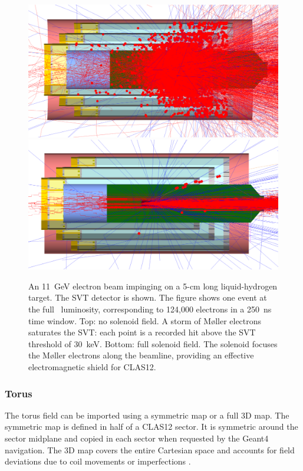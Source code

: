 \begin{figure}
	\centering
	\includegraphics[width=0.98\columnwidth,keepaspectratio]{img/solenoidOFF.png}
	\includegraphics[width=0.98\columnwidth,keepaspectratio]{img/solenoidON.png}
        \caption{An 11~GeV electron beam impinging on a 5-cm long liquid-hydrogen target. The SVT detector is shown. The
          figure shows one event at the full \cLuminosity\ luminosity, corresponding to 124,000 electrons in a 250~ns time
          window. Top: no solenoid field. A storm of M\o ller electrons saturates the SVT: each point is a recorded hit above
          the SVT threshold of 30~keV. Bottom: full solenoid field. The solenoid focuses the M\o ller electrons along the
          beamline, providing an effective electromagnetic shield for CLAS12.}
	\label{fig:solenoidONOFF}
\end{figure}

\subsubsection{Torus}

The torus field can be imported using a symmetric map or a full 3D map. The symmetric map is defined in half of a CLAS12
sector. It is symmetric around the sector midplane and copied in each sector when requested by the Geant4 navigation.
The 3D map covers the entire Cartesian space and accounts for field deviations due to coil movements or imperfections
\cite{GhoshalSolenoid}.

